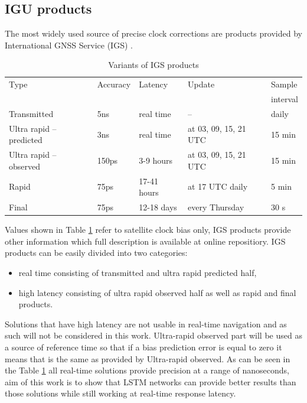 \documentclass{kybernetika}
\begin{document}
\subsection{IGU products}
The most widely used source of precise clock corrections are products provided 
by International GNSS Service (IGS) \cite{IGS}.
\begin{table}[ht] 
	\centering
	\caption{Variants of IGS products}
	\label{tab:igs_products}
	\begin{tabular*}{\textwidth}{*{5}{l}}
		\hline
		\hline
		Type& Accuracy& Latency& Update& Sample \\
		&&&&interval\\
		\hline
		Transmitted & 5ns & real time & -- & daily  \\
		Ultra rapid -- predicted & 3ns & real time & at 03, 09, 15, 21 UTC & 15 min  \\
		Ultra rapid -- observed & 150ps & 3-9 hours & at 03, 09, 15, 21 UTC & 15 min  \\
		Rapid & 75ps & 17-41 hours & at 17 UTC daily & 5 min \\
		Final & 75ps & 12-18 days & every Thursday & 30 s \\
		\hline
		\hline
	\end{tabular*}
\end{table}
Values shown in Table \ref{tab:igs_products} refer to satellite clock bias only,  IGS products
provide other information which full description  is available at online repositiory. 
IGS products can be easily divided into two categories:
\begin{itemize}
	\item real time consisting of transmitted and ultra rapid predicted half,
	\item high latency consisting of ultra rapid observed half as well as rapid and final products.
\end{itemize}
Solutions that have high latency are not usable in real-time navigation and as such will not be
considered in this work. Ultra-rapid observed part will be used as a source of
reference time so that if a bias prediction error is equal to zero it means that is
the same as provided by Ultra-rapid observed.
As can be seen in the Table \ref{tab:igs_products} all real-time solutions provide precision 
at a range of nanoseconds, aim of this work is to show that LSTM networks can provide 
better results than those solutions while still working at real-time response latency.
\end{document}
